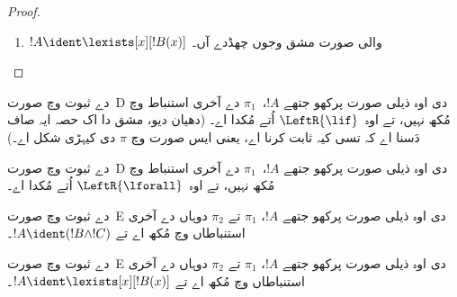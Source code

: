 \documentclass[../../../include/open-logic-section]{subfiles}
\begin{document}
\begin{proof}
\begin{enumerate}
!!{proof}~$\pi_1'$ دا آخری سیکوئنٹ $\Gamma \Sequent \Delta,
!B(c)$ اے، جتھے $c$ اک~$\RightR{\lforall}$ استنباط دا خاص متغیر اے۔ سو $c$،~$!B(x)$، $\Gamma$ یا~$\Delta$ وچ نہیں آؤندا۔ اسیں منّنے آں کہ !!{proof}~$\pi$ باقاعدہ اے، سو $c$ بس اگلے~$\RightR{\lforall}$ استنباط دا خاص متغیر اے تے بس اوہدے اُتّے آؤندا اے، یعنی بس~$\pi_1'$ وچ آؤندا اے، تے~$\pi_1'$ وچ کسے استنباط دا خاص متغیر نہیں۔ چونکہ $c$،~$\pi_2$ وچ نہیں آؤندا، ایہ~$t$ وچ وی نہیں آ سکدا۔  مطابق !!{proof}~$\Subst{\pi_1'}{t}{c}$ اک !!a{proof} اے $\Gamma \Sequent \Delta,
!B(t)$ دا۔ ہُن استقرا دا مفروضہ ایس !!{proof} اُتے لاؤ:
\[
\AxiomC{}
\RightLabel{$\Subst{\pi_1'}{t}{c}$}
\Deduce$\Gamma \fCenter \Delta, !B(t)$
\AxiomC{}
\RightLabel{$\pi_2''$}
\Deduce$!B(t), \Gamma \fCenter \Delta$
\RightLabel{\CutCS}
\BinaryInf$\Gamma \fCenter \Delta$
\DisplayProof
\]
(استقرا دا مفروضہ ایس لئی لگدا اے کہ قطع !!{formula}~$!B(t)$ اے، سو !!{proof} دا قطع درجہ~$\pi$ توں گھٹ اے۔)
\item $!A \ident \lexists[x][!B(x)]$ والی صورت مشق وجوں چھڈدے آں۔
\end{enumerate}
\end{proof}

\begin{prob}
 دے ثبوت وچ صورت~D دی اوہ ذیلی صورت پرکھو جتھے $!A$،~$\pi_1$ دے آخری استنباط وچ مُکھ نہیں، تے اوہ~$\LeftR{\lif}$ اُتے مُکدا اے۔ (دھیان دیو، مشق دا اک حصہ ایہ صاف دَسنا اے کہ تسی کیہ ثابت کرنا اے، یعنی ایس صورت وچ $\pi$ دی کیہڑی شکل اے۔)
\end{prob}

\begin{prob}
 دے ثبوت وچ صورت~D دی اوہ ذیلی صورت پرکھو جتھے $!A$،~$\pi_1$ دے آخری استنباط وچ مُکھ نہیں، تے اوہ~$\LeftR{\lforall}$ اُتے مُکدا اے۔
\end{prob}

\begin{prob}
 دے ثبوت وچ صورت~E دی اوہ ذیلی صورت پرکھو جتھے $!A$، $\pi_1$ تے $\pi_2$ دوہاں دے آخری استنباطاں وچ مُکھ اے تے $!A \ident (!B \land !C)$۔
\end{prob}

\begin{prob}
 دے ثبوت وچ صورت~E دی اوہ ذیلی صورت پرکھو جتھے $!A$، $\pi_1$ تے $\pi_2$ دوہاں دے آخری استنباطاں وچ مُکھ اے تے $!A \ident \lexists[x][!B(x)]$۔
\end{prob}
\end{document}
